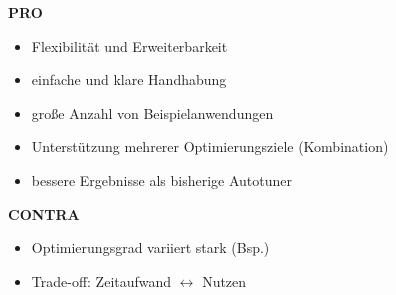   \begin{frame}
  
   \textbf{PRO\\}
   \begin{itemize}
      \item Flexibilität und Erweiterbarkeit

      \item einfache und klare Handhabung
      
      \item große Anzahl von Beispielanwendungen
      
      \item Unterstützung mehrerer Optimierungsziele (Kombination)

      \item bessere Ergebnisse als bisherige Autotuner
        
     \end{itemize}

    \text{} %
      
   \textbf{CONTRA\\}
    \begin{itemize}
      \item Optimierungsgrad variiert stark (Bsp.)
      
      \item Trade-off: Zeitaufwand $\leftrightarrow$ Nutzen
      \end{itemize}
    
  \end{frame}
  
  
\begingroup
{}

